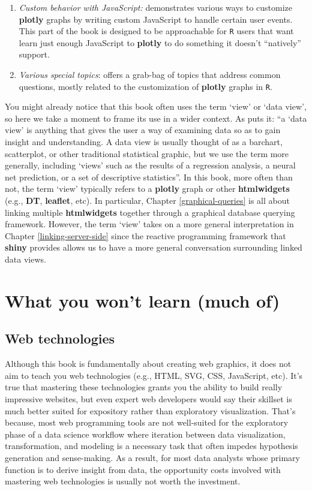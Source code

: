 \documentclass[
  12pt,
]{krantz}
\begin{document}
\begin{enumerate}
\item
  \emph{Custom behavior with JavaScript:} demonstrates various ways to customize \textbf{plotly} graphs by writing custom JavaScript to handle certain user events. This part of the book is designed to be approachable for \texttt{R} users that want learn just enough JavaScript to \textbf{plotly} to do something it doesn't ``natively'' support.
\item
  \emph{Various special topics}: offers a grab-bag of topics that address common questions, mostly related to the customization of \textbf{plotly} graphs in \texttt{R}.
\end{enumerate}

You might already notice that this book often uses the term `view' or `data view', so here we take a moment to frame its use in a wider context. As \citet{Wills2008} puts it: ``a `data view' is anything that gives the user a way of examining data so as to gain insight and understanding. A data view is usually thought of as a barchart, scatterplot, or other traditional statistical graphic, but we use the term more generally, including `views' such as the results of a regression analysis, a neural net prediction, or a set of descriptive statistics''. In this book, more often than not, the term `view' typically refers to a \textbf{plotly} graph or other \textbf{htmlwidgets} (e.g., \textbf{DT}, \textbf{leaflet}, etc). In particular, Chapter \ref{graphical-queries} is all about linking multiple \textbf{htmlwidgets} together through a graphical database querying framework. However, the term `view' takes on a more general interpretation in Chapter \ref{linking-server-side} since the reactive programming framework that \textbf{shiny} provides allows us to have a more general conversation surrounding linked data views.

\hypertarget{what-you-wont-learn-much-of}{%
\section{What you won't learn (much of)}\label{what-you-wont-learn-much-of}}

\hypertarget{web-technologies}{%
\subsection{Web technologies}\label{web-technologies}}

Although this book is fundamentally about creating web graphics, it does not aim to teach you web technologies (e.g., HTML, SVG, CSS, JavaScript, etc). It's true that mastering these technologies grants you the ability to build really impressive websites, but even expert web developers would say their skillset is much better suited for expository rather than exploratory visualization. That's because, most web programming tools are not well-suited for the exploratory phase of a data science workflow where iteration between data visualization, transformation, and modeling is a necessary task that often impedes hypothesis generation and sense-making. As a result, for most data analysts whose primary function is to derive insight from data, the opportunity costs involved with mastering web technologies is usually not worth the investment.
\end{document}
